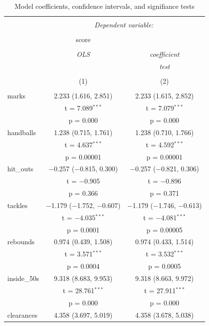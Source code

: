 \documentclass{article}
\begin{document}
\begin{table}[!htbp] \centering 
  \caption{Model coefficients, confidence intervals, and signifiance tests} 
  \label{tab:coeftable} 
\begin{tabular}{@{\extracolsep{5pt}}lcc} 
\\[-1.8ex]\hline 
\hline \\[-1.8ex] 
 & \multicolumn{2}{c}{\textit{Dependent variable:}} \\ 
\cline{2-3} 
\\[-1.8ex] & score &   \\ 
\\[-1.8ex] & \textit{OLS} & \textit{coefficient} \\ 
 & \textit{} & \textit{test} \\ 
\\[-1.8ex] & (1) & (2)\\ 
\hline \\[-1.8ex] 
 marks & 2.233 (1.616, 2.851) & 2.233 (1.615, 2.852) \\ 
  & t = 7.089$^{***}$ & t = 7.079$^{***}$ \\ 
  & p = 0.000 & p = 0.000 \\ 
  handballs & 1.238 (0.715, 1.761) & 1.238 (0.710, 1.766) \\ 
  & t = 4.637$^{***}$ & t = 4.592$^{***}$ \\ 
  & p = 0.00001 & p = 0.00001 \\ 
  hit\_outs & $-$0.257 ($-$0.815, 0.300) & $-$0.257 ($-$0.821, 0.306) \\ 
  & t = $-$0.905 & t = $-$0.896 \\ 
  & p = 0.366 & p = 0.371 \\ 
  tackles & $-$1.179 ($-$1.752, $-$0.607) & $-$1.179 ($-$1.746, $-$0.613) \\ 
  & t = $-$4.035$^{***}$ & t = $-$4.081$^{***}$ \\ 
  & p = 0.0001 & p = 0.00005 \\ 
  rebounds & 0.974 (0.439, 1.508) & 0.974 (0.433, 1.514) \\ 
  & t = 3.571$^{***}$ & t = 3.532$^{***}$ \\ 
  & p = 0.0004 & p = 0.0005 \\ 
  inside\_50s & 9.318 (8.683, 9.953) & 9.318 (8.663, 9.972) \\ 
  & t = 28.761$^{***}$ & t = 27.911$^{***}$ \\ 
  & p = 0.000 & p = 0.000 \\ 
  clearances & 4.358 (3.697, 5.019) & 4.358 (3.678, 5.038) \\ 

\end{tabular}
\end{table}
\end{document}
